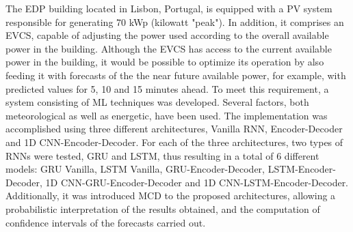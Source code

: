 \noindent The \ac{EDP} building located in Lisbon, Portugal, is equipped with a \ac{PV} system responsible for generating 70 kWp (kilowatt "peak"). In addition, it comprises an \ac{EVCS}, capable of adjusting the power used according to the overall available power in the building. Although the \ac{EVCS} has access to the current available power in the building, it would be possible to optimize its operation by also feeding it with forecasts of the the near future available power, for example, with predicted values for 5, 10 and 15 minutes ahead. To meet this requirement, a system consisting of \ac{ML} techniques was developed. Several factors, both meteorological as well as energetic, have been used. The implementation was accomplished using three different architectures, Vanilla \ac{RNN}, Encoder-Decoder and \ac{1D CNN}-Encoder-Decoder. For each of the three architectures, two types of \ac{RNN}s were tested, \ac{GRU} and \ac{LSTM}, thus resulting in a total of 6 different models: \ac{GRU} Vanilla, \ac{LSTM} Vanilla, \ac{GRU}-Encoder-Decoder, \ac{LSTM}-Encoder-Decoder, \ac{1D CNN}-\ac{GRU}-Encoder-Decoder and \ac{1D CNN}-\ac{LSTM}-Encoder-Decoder. Additionally, it was introduced \ac{MCD} to the proposed architectures, allowing a probabilistic interpretation of the results obtained, and the computation of confidence intervals of the forecasts carried out.
